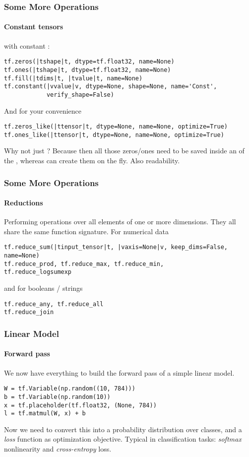 
\begin{frame}[fragile]
    \frametitle{Some More Operations}
    \framesubtitle{Constant tensors}
     with constant : 
    \begin{lstlisting}  
tf.zeros(|tshape|t, dtype=tf.float32, name=None)
tf.ones(|tshape|t, dtype=tf.float32, name=None)
tf.fill(|tdims|t, |tvalue|t, name=None)
tf.constant(|vvalue|v, dtype=None, shape=None, name='Const', 
            verify_shape=False)
    \end{lstlisting}
    \pause
    And for your convenience
    \begin{lstlisting}  
tf.zeros_like(|ttensor|t, dtype=None, name=None, optimize=True)
tf.ones_like(|ttensor|t, dtype=None, name=None, optimize=True)
    \end{lstlisting}
    \pause
    Why not just ?
    \pause
    Because then all those zeros/ones need to be saved inside an  of the ,
    whereas  can create them on the fly. Also readability.
\end{frame}

\begin{frame}[fragile]
    \frametitle{Some More Operations}
    \framesubtitle{Reductions}
    Performing operations over all elements of one or more dimensions. They all share the same function signature.
    For numerical data
    \begin{lstlisting}  
tf.reduce_sum(|tinput_tensor|t, |vaxis=None|v, keep_dims=False, name=None)
tf.reduce_prod, tf.reduce_max, tf.reduce_min, 
tf.reduce_logsumexp
    \end{lstlisting}
    and for booleans / strings
    \begin{lstlisting}  
tf.reduce_any, tf.reduce_all
tf.reduce_join
    \end{lstlisting}
\end{frame}

\begin{frame}[fragile]
    \frametitle{Linear Model}
    \framesubtitle{Forward pass}
    We now have everything to build the forward pass of a simple linear model.
    \begin{lstlisting}  
W = tf.Variable(np.random((10, 784)))
b = tf.Variable(np.random(10))
x = tf.placeholder(tf.float32, (None, 784))
l = tf.matmul(W, x) + b
    \end{lstlisting}
    \pause
    Now we need to convert this into a probability distribution over classes, 
    and a \emph{loss} function as optimization objective. Typical in classification tasks:
    \emph{softmax} nonlinearity and \emph{cross-entropy} loss.
\end{frame}

